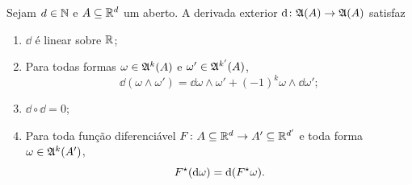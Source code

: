 \begin{proposition}
Sejam $d \in \mathbb{N}$ e $A \subseteq \mathbb{R}^d$ um aberto. A derivada exterior $\mathrm{d}\colon \mathfrak{A} (A) \to \mathfrak{A} (A)$ satisfaz
	\begin{enumerate}
	\item $\dd$ é linear sobre $\mathbb{R}$;
	\item  Para todas formas $\omega \in \mathfrak{A}^k (A)$ e $\omega' \in \mathfrak{A}^{k'} (A)$,
		\begin{equation*}
		\dd(\omega \wedge \omega') = \dd\omega \wedge \omega' + (-1)^k\omega \wedge \dd \omega';
		\end{equation*}
	\item $\dd \circ \dd = 0$;
	\item Para toda função diferenciável $F\colon A \subseteq \mathbb{R}^d \to A' \subseteq \mathbb{R}^{d'}$ e toda forma $\omega \in \mathfrak{A}^k(A')$,
		\begin{equation*}
		F^\star(\mathrm{d}\omega) = \mathrm{d} (F^\star\omega).
		\end{equation*}
	\end{enumerate}
\end{proposition}
